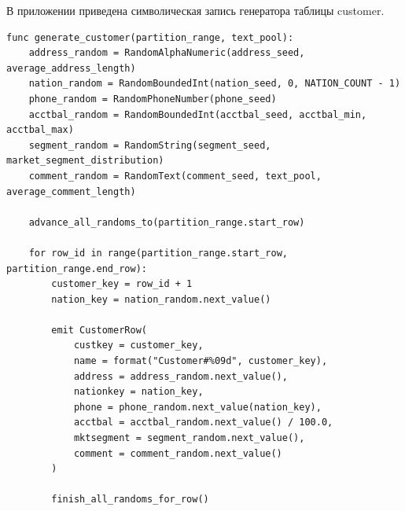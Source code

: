 \setcounter{appendixlstbase}{\value{lstlisting}}
\renewcommand{\thelstlisting}{\Asbuk{appendicesnum}.\number\numexpr\value{lstlisting}-\value{appendixlstbase}\relax}
\label{appendix:customer}

В приложении приведена символическая запись генератора таблицы
customer.

\begin{lstlisting}[style=reportpseudocode,caption={Формирование таблицы customer},label={lst:app-customer}]
func generate_customer(partition_range, text_pool):
    address_random = RandomAlphaNumeric(address_seed, average_address_length)
    nation_random = RandomBoundedInt(nation_seed, 0, NATION_COUNT - 1)
    phone_random = RandomPhoneNumber(phone_seed)
    acctbal_random = RandomBoundedInt(acctbal_seed, acctbal_min, acctbal_max)
    segment_random = RandomString(segment_seed, market_segment_distribution)
    comment_random = RandomText(comment_seed, text_pool, average_comment_length)

    advance_all_randoms_to(partition_range.start_row)

    for row_id in range(partition_range.start_row, partition_range.end_row):
        customer_key = row_id + 1
        nation_key = nation_random.next_value()

        emit CustomerRow(
            custkey = customer_key,
            name = format("Customer#%09d", customer_key),
            address = address_random.next_value(),
            nationkey = nation_key,
            phone = phone_random.next_value(nation_key),
            acctbal = acctbal_random.next_value() / 100.0,
            mktsegment = segment_random.next_value(),
            comment = comment_random.next_value()
        )

        finish_all_randoms_for_row()
\end{lstlisting}
